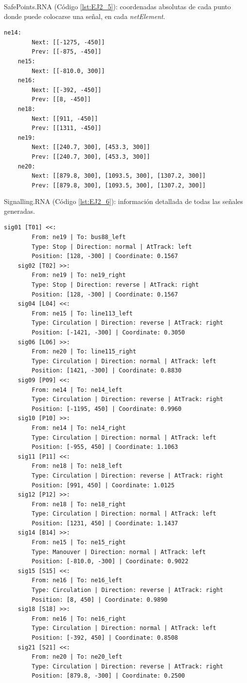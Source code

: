 	SafePoints.RNA (Código \ref{lst:EJ2_5}): coordenadas absolutas de cada punto donde puede colocarse una señal, en cada \textit{netElement}.

	\begin{lstlisting}[language = {}, caption = SafePoints.RNA, label = {lst:EJ2_5}]
	ne14:
		Next: [[-1275, -450]]
		Prev: [[-875, -450]]
	ne15:
		Next: [[-810.0, 300]]
	ne16:
		Next: [[-392, -450]]
		Prev: [[8, -450]]
	ne18:
		Next: [[911, -450]]
		Prev: [[1311, -450]]
	ne19:
		Next: [[240.7, 300], [453.3, 300]]
		Prev: [[240.7, 300], [453.3, 300]]
	ne20:
		Next: [[879.8, 300], [1093.5, 300], [1307.2, 300]]
		Prev: [[879.8, 300], [1093.5, 300], [1307.2, 300]]
	\end{lstlisting}

	Signalling.RNA (Código \ref{lst:EJ2_6}): información detallada de todas las señales generadas.

	\begin{lstlisting}[language = {}, caption = Signalling.RNA, label = {lst:EJ2_6}]
	sig01 [T01] <<:
		From: ne19 | To: bus88_left
		Type: Stop | Direction: normal | AtTrack: left 
		Position: [128, -300] | Coordinate: 0.1567
	sig02 [T02] >>:
		From: ne19 | To: ne19_right
		Type: Stop | Direction: reverse | AtTrack: right 
		Position: [128, -300] | Coordinate: 0.1567
	sig04 [L04] <<:
		From: ne15 | To: line113_left
		Type: Circulation | Direction: reverse | AtTrack: right 
		Position: [-1421, -300] | Coordinate: 0.3050
	sig06 [L06] >>:
		From: ne20 | To: line115_right
		Type: Circulation | Direction: normal | AtTrack: left 
		Position: [1421, -300] | Coordinate: 0.8830
	sig09 [P09] <<:
		From: ne14 | To: ne14_left
		Type: Circulation | Direction: reverse | AtTrack: right 
		Position: [-1195, 450] | Coordinate: 0.9960
	sig10 [P10] >>:
		From: ne14 | To: ne14_right
		Type: Circulation | Direction: normal | AtTrack: left 
		Position: [-955, 450] | Coordinate: 1.1063
	sig11 [P11] <<:
		From: ne18 | To: ne18_left
		Type: Circulation | Direction: reverse | AtTrack: right 
		Position: [991, 450] | Coordinate: 1.0125
	sig12 [P12] >>:
		From: ne18 | To: ne18_right
		Type: Circulation | Direction: normal | AtTrack: left 
		Position: [1231, 450] | Coordinate: 1.1437
	sig14 [B14] >>:
		From: ne15 | To: ne15_right
		Type: Manouver | Direction: normal | AtTrack: left 
		Position: [-810.0, -300] | Coordinate: 0.9022
	sig15 [S15] <<:
		From: ne16 | To: ne16_left
		Type: Circulation | Direction: reverse | AtTrack: right 
		Position: [8, 450] | Coordinate: 0.9890
	sig18 [S18] >>:
		From: ne16 | To: ne16_right
		Type: Circulation | Direction: normal | AtTrack: left 
		Position: [-392, 450] | Coordinate: 0.8508
	sig21 [S21] <<:
		From: ne20 | To: ne20_left
		Type: Circulation | Direction: reverse | AtTrack: right 
		Position: [879.8, -300] | Coordinate: 0.2500
	\end{lstlisting}

